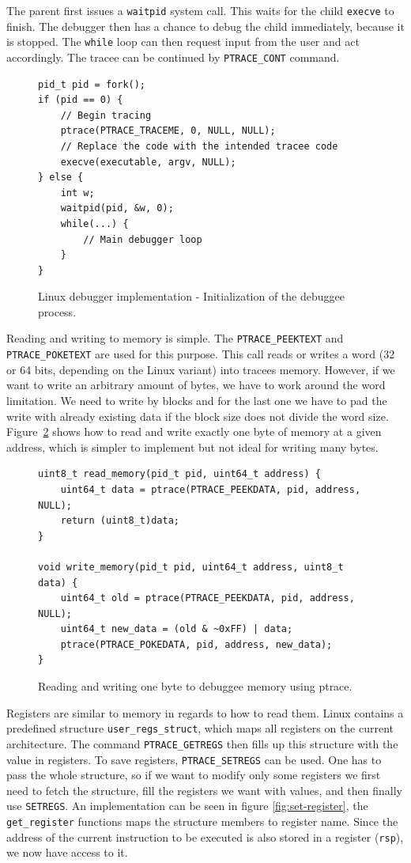 The parent first issues a \texttt{waitpid} system call. This waits for the
child \texttt{execve} to finish. The debugger then has a chance to debug the
child immediately, because it is stopped. The \texttt{while} loop can then
request input from the user and act accordingly. The tracee can be continued by
\texttt{PTRACE\_CONT} command.

\begin{figure}
    \begin{verbatim}
pid_t pid = fork();
if (pid == 0) {
    // Begin tracing
    ptrace(PTRACE_TRACEME, 0, NULL, NULL);
    // Replace the code with the intended tracee code
    execve(executable, argv, NULL);
} else {
    int w;
    waitpid(pid, &w, 0);
    while(...) {
        // Main debugger loop
    }
}
    \end{verbatim}
    \caption{Linux debugger implementation - Initialization of the debuggee
    process.}
    \label{fig:debugger-init}
\end{figure}

Reading and writing to memory is simple. The \texttt{PTRACE\_PEEKTEXT} and
\texttt{PTRACE\_POKETEXT} are used for this purpose. This call reads or writes
a word (32 or 64 bits, depending on the Linux variant) into tracees memory.
However, if we want to write an arbitrary amount of bytes, we have to work
around the word limitation. We need to write by blocks and for the last one we
have to pad the write with already existing data if the block size does not
divide the word size. Figure~\ref{fig:write-read} shows how to read and
write exactly one byte of memory at a given address, which is simpler to
implement but not ideal for writing many bytes.

\begin{figure}
    \begin{verbatim}
uint8_t read_memory(pid_t pid, uint64_t address) {
    uint64_t data = ptrace(PTRACE_PEEKDATA, pid, address, NULL);
    return (uint8_t)data;
}

void write_memory(pid_t pid, uint64_t address, uint8_t data) {
    uint64_t old = ptrace(PTRACE_PEEKDATA, pid, address, NULL);
    uint64_t new_data = (old & ~0xFF) | data;
    ptrace(PTRACE_POKEDATA, pid, address, new_data);
}
    \end{verbatim}
    \caption{Reading and writing one byte to debuggee memory using ptrace.}
    \label{fig:write-read}
\end{figure}

Registers are similar to memory in regards to how to read them. Linux
contains a predefined structure \texttt{user\_regs\_struct}, which maps all
registers on the current architecture. The command \texttt{PTRACE\_GETREGS}
then fills up this structure with the value in registers. To save registers,
\texttt{PTRACE\_SETREGS} can be used. One has to pass the whole structure, so
if we want to modify only some registers we first need to fetch the structure,
fill the registers we want with values, and then finally use \texttt{SETREGS}.
An implementation can be seen in figure \ref{fig:set-register}, the
\texttt{get\_register} functions maps the structure members to register name.
Since the address of the current instruction to be executed is also stored in a
register (\texttt{rsp}), we now have access to it.

